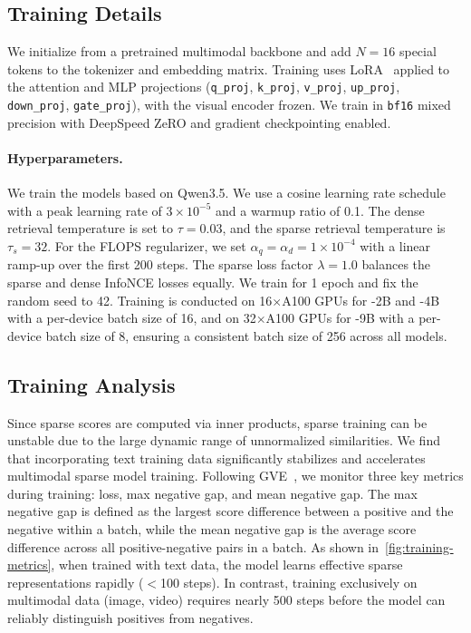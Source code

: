 \subsection{Training Details}

We initialize from a pretrained multimodal backbone and add $N{=}16$ special tokens to the tokenizer and embedding matrix.
Training uses LoRA~\citep{lora2022} applied to the attention and MLP projections (\texttt{q\_proj}, \texttt{k\_proj}, \texttt{v\_proj}, \texttt{up\_proj}, \texttt{down\_proj}, \texttt{gate\_proj}), with the visual encoder frozen.
We train in \texttt{bf16} mixed precision with DeepSpeed ZeRO and gradient checkpointing enabled.


\paragraph{Hyperparameters.}
We train the \ours models based on Qwen3.5. 
We use a cosine learning rate schedule with a peak learning rate of $3{\times}10^{-5}$ and a warmup ratio of 0.1. 
The dense retrieval temperature is set to $\tau{=}0.03$, and the sparse retrieval temperature is $\tau_s{=}32$. 
For the FLOPS regularizer, we set $\alpha_q = \alpha_d = 1{\times}10^{-4}$ with a linear ramp-up over the first 200 steps. 
The sparse loss factor $\lambda{=}1.0$ balances the sparse and dense InfoNCE losses equally.
We train for 1 epoch and fix the random seed to 42. 
Training is conducted on 16$\times$A100 GPUs for \ours-2B and \ours-4B with a per-device batch size of 16, and on 32$\times$A100 GPUs for \ours-9B with a per-device batch size of 8, ensuring a consistent batch size of 256 across all models.

\subsection{Training Analysis}

Since sparse scores are computed via inner products, sparse training can be unstable due to the large dynamic range of unnormalized similarities.
We find that incorporating text training data significantly stabilizes and accelerates multimodal sparse model training.
Following GVE~\citep{gve}, we monitor three key metrics during training: loss, max negative gap, and mean negative gap. The max negative gap is defined as the largest score difference between a positive and the negative within a batch, while the mean negative gap is the average score difference across all positive-negative pairs in a batch. 
As shown in~\autoref{fig:training-metrics}, when trained with text data, the model learns effective sparse representations rapidly ($<$100 steps). In contrast, training exclusively on multimodal data (\eg image, video) requires nearly 500 steps before the model can reliably distinguish positives from negatives.



